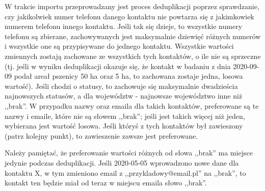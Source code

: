 \documentclass[12pt, twoside, hidelinks]{report}
\begin{document}
W trakcie importu przeprowadzany jest proces deduplikacji poprzez sprawdzanie, czy jakikolwiek numer telefonu danego kontaktu nie powtarza się z jakimkowiek numerem telefonu innego kontaktu. Jeśli tak się dzieje, to wszystkie numery telefonu są zbierane, zachowywanych jest maksymalnie dziewięć różnych numerów i wszystkie one są przypisywane do jednego kontaktu. Wszystkie wartości zmiennych zostają zachowane ze wszystkich tych kontaktów, o ile nie są sprzeczne (tj. jeśli w wyniku deduplikacji okazuje się, że kontakt w badaniu z dnia 2020-09-09 podał areał pszenicy 50 ha oraz 5 ha, to zachowana zostaje jedna, losowa wartość). Jeśli chodzi o statusy, to zachowuje się maksymalnie dwadzieścia najnowszych statusów, a dla województw - najnowsze województwo inne niż ,,brak''. W przypadku nazwy oraz emaila dla takich kontaktów, preferowane są te nazwy i emaile, które nie są słowem ,,brak''; jeśli jest takich więcej niż jeden, wybierana jest wartość losowa. Jeśli któryś z tych kontaktów był zawieszony (patrz kolejny punkt), to zawieszenie zawsze jest preferowane. \par 
Należy pamiętać, że preferowanie wartości różnych od słowa ,,brak'' ma miejsce jedynie podczas deduplikacji. Jeśli 2020-05-05 wprowadzono nowe dane dla kontaktu X, w tym zmieniono email z ,,przykladowy@email.pl'' na ,,brak'', to kontakt ten będzie miał od teraz w miejscu emaila słowo ,,brak''.
\end{document}
